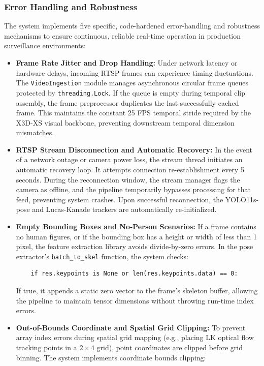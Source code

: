 \documentclass[12pt]{article}
\begin{document}
\subsubsection{Error Handling and Robustness}
The system implements five specific, code-hardened error-handling and robustness mechanisms to ensure continuous, reliable real-time operation in production surveillance environments:
\begin{itemize}
    \item \textbf{Frame Rate Jitter and Drop Handling:} Under network latency or hardware delays, incoming RTSP frames can experience timing fluctuations. The \texttt{VideoIngestion} module manages asynchronous circular frame queues protected by \texttt{threading.Lock}. If the queue is empty during temporal clip assembly, the frame preprocessor duplicates the last successfully cached frame. This maintains the constant 25 FPS temporal stride required by the X3D-XS visual backbone, preventing downstream temporal dimension mismatches.
    \item \textbf{RTSP Stream Disconnection and Automatic Recovery:} In the event of a network outage or camera power loss, the stream thread initiates an automatic recovery loop. It attempts connection re-establishment every 5 seconds. During the reconnection window, the stream manager flags the camera as offline, and the pipeline temporarily bypasses processing for that feed, preventing system crashes. Upon successful reconnection, the YOLO11s-pose and Lucas-Kanade trackers are automatically re-initialized.
    \item \textbf{Empty Bounding Boxes and No-Person Scenarios:} If a frame contains no human figures, or if the bounding box has a height or width of less than 1 pixel, the feature extraction library avoids divide-by-zero errors. In the pose extractor's \texttt{batch\_to\_skel} function, the system checks:
    \begin{verbatim}
    if res.keypoints is None or len(res.keypoints.data) == 0:
    \end{verbatim}
    If true, it appends a static zero vector to the frame's skeleton buffer, allowing the pipeline to maintain tensor dimensions without throwing run-time index errors.
    \item \textbf{Out-of-Bounds Coordinate and Spatial Grid Clipping:} To prevent array index errors during spatial grid mapping (e.g., placing LK optical flow tracking points in a $2 \times 4$ grid), point coordinates are clipped before grid binning. The system implements coordinate bounds clipping:

\end{itemize}
\end{document}
